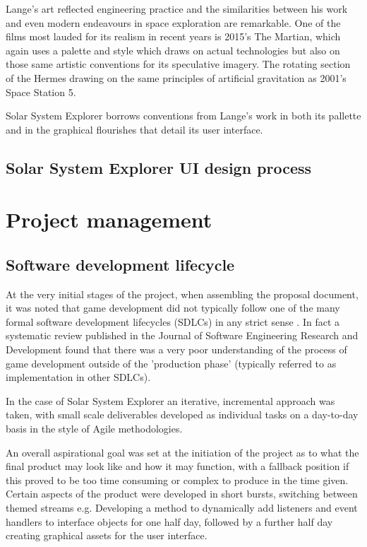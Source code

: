 \documentclass[twoside]{bhamthesis}
\begin{document}
Lange's art reflected engineering practice and the similarities between his work and even modern endeavours in space exploration are remarkable. One of the films most lauded for its realism in recent years is 2015's The Martian, which again uses a palette and style which draws on actual technologies but also on those same artistic conventions for its speculative imagery. The rotating section of the Hermes drawing on the same principles of artificial gravitation as 2001's Space Station 5.

Solar System Explorer borrows conventions from Lange's work in both its pallette and in the graphical flourishes that detail its user interface.

\subsection{Solar System Explorer UI design process}


\section{Project management}

\subsection{Software development lifecycle}
At the very initial stages of the project, when assembling the proposal document, it was noted that game development did not typically follow one of the many formal software development lifecycles (SDLCs) in any strict sense \cite{ramadan_game_2013}. In fact a systematic review published in the Journal of Software Engineering Research and Development found that there was a very poor understanding of the process of game development outside of the 'production phase' (typically referred to as implementation in other SDLCs).

In the case of Solar System Explorer an iterative, incremental approach was taken, with small scale deliverables developed as individual tasks on a day-to-day basis in the style of Agile methodologies.

An overall aspirational goal was set at the initiation of the project as to what the final product may look like and how it may function, with a fallback position if this proved to be too time consuming or complex to produce in the time given. Certain aspects of the product were developed in short bursts, switching between themed streams e.g. Developing a method to dynamically add listeners and event handlers to interface objects for one half day, followed by a further half day creating graphical assets for the user interface.
\end{document}
